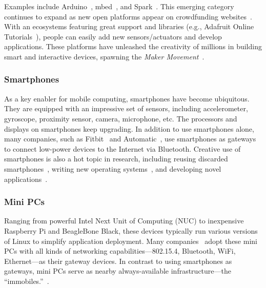 Examples include Arduino~\cite{arduino}, mbed~\cite{mbed}, and
Spark~\cite{spark}. This emerging category continues to expand as new open
platforms appear on crowdfunding websites~\cite{kickstarter}.  With an
ecosystems featuring great support and libraries (e.g., Adafruit Online
Tutorials~\cite{adafruit}), people can easily add new sensors/actuators and
develop applications. These platforms have unleashed the creativity of millions
in building smart and interactive devices, spawning the \textit{Maker
  Movement}~\cite{dougherty2012maker}.

\subsubsection{Smartphones}

As a key enabler for mobile computing, smartphones have become ubiquitous. They
are equipped with an impressive set of sensors, including accelerometer,
gyroscope, proximity sensor, camera, microphone, etc. The processors and
displays on smartphones keep upgrading. In addition to use smartphones alone,
many companies, such as Fitbit~\cite{fitbit} and Automatic~\cite{automatic}, use
smartphones as gateways to connect low-power devices to the Internet via
Bluetooth. Creative use of smartphones is also a hot topic in research,
including reusing discarded smartphones~\cite{challen2014mote}, writing new
operating systems~\cite{janos}, and developing novel
applications~\cite{hong2014smartphone}.

\subsubsection{Mini PCs}

Ranging from powerful Intel Next Unit of Computing (NUC) to inexpensive
Raspberry Pi and BeagleBone Black, these devices typically run various versions
of Linux to simplify application deployment. Many companies~\cite{ninja,
  smartthings, wink} adopt these mini PCs with all kinds of networking
capabilities---802.15.4, Bluetooth, WiFi, Ethernet---as their gateway devices.
In contrast to using smartphones as gateways, mini PCs serve as nearby
always-available infrastructure---the ``immobiles.''~\cite{swarmbox}.

